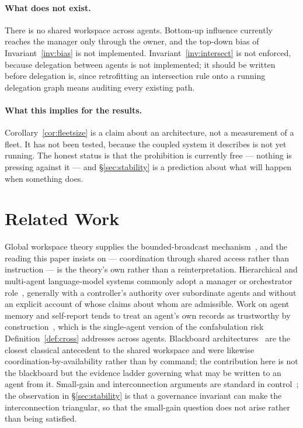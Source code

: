 \documentclass[11pt]{article}
\begin{document}
\paragraph{What does not exist.} There is no shared workspace across agents. Bottom-up influence currently reaches the manager only through the owner, and the top-down bias of Invariant~\ref{inv:bias} is not implemented. Invariant~\ref{inv:intersect} is not enforced, because delegation between agents is not implemented; it should be written before delegation is, since retrofitting an intersection rule onto a running delegation graph means auditing every existing path.

\paragraph{What this implies for the results.} Corollary~\ref{cor:fleetsize} is a claim about an architecture, not a measurement of a fleet. It has not been tested, because the coupled system it describes is not yet running. The honest status is that the prohibition is currently free --- nothing is pressing against it --- and \S\ref{sec:stability} is a prediction about what will happen when something does.

\section{Related Work}
\label{sec:related}

Global workspace theory supplies the bounded-broadcast mechanism~\citep{dehaene1998workspace,dehaene2011conscious}, and the reading this paper insists on --- coordination through shared access rather than instruction --- is the theory's own rather than a reinterpretation. Hierarchical and multi-agent language-model systems commonly adopt a manager or orchestrator role~\citep{wu2023autogen,hong2024metagpt,park2023generative}, generally with a controller's authority over subordinate agents and without an explicit account of whose claims about whom are admissible. Work on agent memory and self-report tends to treat an agent's own records as trustworthy by construction~\citep{packer2023memgpt}, which is the single-agent version of the confabulation risk Definition~\ref{def:cross} addresses across agents. Blackboard architectures~\citep{hayesroth1985blackboard} are the closest classical antecedent to the shared workspace and were likewise coordination-by-availability rather than by command; the contribution here is not the blackboard but the evidence ladder governing what may be written to an agent from it. Small-gain and interconnection arguments are standard in control~\citep{jiang1994smallgain}; the observation in \S\ref{sec:stability} is that a governance invariant can make the interconnection triangular, so that the small-gain question does not arise rather than being satisfied.
\end{document}
